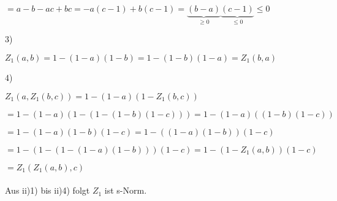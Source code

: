 $= a-b -ac + bc = -a(c-1) + b(c-1) = \underbrace{(b-a)}_{\geq 0}\underbrace{(c-1)}_{\leq 0} \leq 0 $

3)

$Z_1(a,b) = 1-(1-a)(1-b) = 1-(1-b)(1-a) = Z_1(b,a)$

4)

$Z_1(a,Z_1(b,c)) = 1-(1-a)(1-Z_1(b,c))$

$= 1-(1-a)(1-(1-(1-b)(1-c))) = 1-(1-a)((1-b)(1-c))$

$= 1-(1-a)(1-b)(1-c) = 1 - ((1-a)(1-b))(1-c)$

$= 1 - (1-(1-(1-a)(1-b)))(1-c) = 1 - (1-Z_1(a,b))(1-c)$

$= Z_1(Z_1(a,b),c)$

\paragraph*{}

Aus ii)1) bis ii)4) folgt $Z_1$ ist s-Norm.
 


